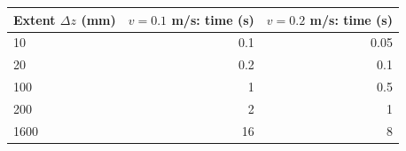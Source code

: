\begin{tabular}{lrr}\toprule
Extent $\Delta z$ (mm) & $v=0.1$ m/s: time (s) & $v=0.2$ m/s: time (s)\\\midrule
10 & 0.1 & 0.05\\
20 & 0.2 & 0.1\\
100 & 1 & 0.5\\
200 & 2 & 1\\
1600 & 16 & 8\\
\bottomrule\end{tabular}
